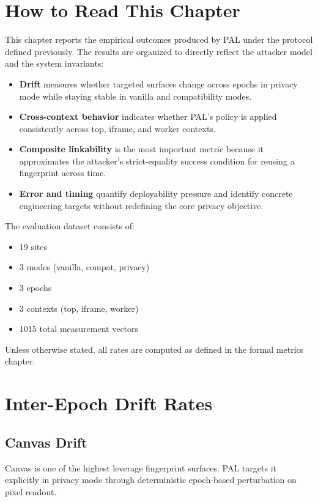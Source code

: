 \documentclass[11pt]{report}
\begin{document}
\section{How to Read This Chapter}

This chapter reports the empirical outcomes produced by PAL under the protocol defined previously. The results are organized to directly reflect the attacker model and the system invariants:

\begin{itemize}
    \item \textbf{Drift} measures whether targeted surfaces change across epochs in privacy mode while staying stable in vanilla and compatibility modes.
    \item \textbf{Cross-context behavior} indicates whether PAL’s policy is applied consistently across top, iframe, and worker contexts.
    \item \textbf{Composite linkability} is the most important metric because it approximates the attacker’s strict-equality success condition for reusing a fingerprint across time.
    \item \textbf{Error and timing} quantify deployability pressure and identify concrete engineering targets without redefining the core privacy objective.
\end{itemize}

The evaluation dataset consists of:
\begin{itemize}
    \item 19 sites
    \item 3 modes (vanilla, compat, privacy)
    \item 3 epochs
    \item 3 contexts (top, iframe, worker)
    \item 1015 total measurement vectors
\end{itemize}

Unless otherwise stated, all rates are computed as defined in the formal metrics chapter.

\section{Inter-Epoch Drift Rates}

\subsection{Canvas Drift}

Canvas is one of the highest leverage fingerprint surfaces. PAL targets it explicitly in privacy mode through deterministic epoch-based perturbation on pixel readout.
\end{document}
